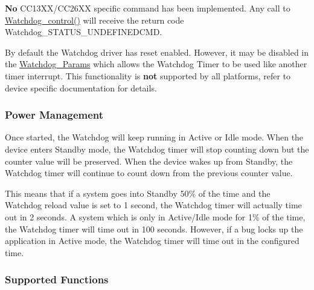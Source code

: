 {\bfseries No} C\+C13\+X\+X/\+C\+C26\+X\+X specific command has been implemented. Any call to \hyperlink{_watchdog_8h_aa98a75361edb1e476432669169f2950e}{Watchdog\+\_\+control()} will receive the return code Watchdog\+\_\+\+S\+T\+A\+T\+U\+S\+\_\+\+U\+N\+D\+E\+F\+I\+N\+E\+D\+C\+M\+D.

By default the Watchdog driver has reset enabled. However, it may be disabled in the \hyperlink{struct_watchdog___params}{Watchdog\+\_\+\+Params} which allows the Watchdog Timer to be used like another timer interrupt. This functionality is {\bfseries not} supported by all platforms, refer to device specific documentation for details.

\subsubsection*{Power Management}

Once started, the Watchdog will keep running in Active or Idle mode. When the device enters Standby mode, the Watchdog timer will stop counting down but the counter value will be preserved. When the device wakes up from Standby, the Watchdog timer will continue to count down from the previous counter value.

This means that if a system goes into Standby 50\% of the time and the Watchdog reload value is set to 1 second, the Watchdog timer will actually time out in 2 seconds. A system which is only in Active/\+Idle mode for 1\% of the time, the Watchdog timer will time out in 100 seconds. However, if a bug locks up the application in Active mode, the Watchdog timer will time out in the configured time.

\subsubsection*{Supported Functions}

